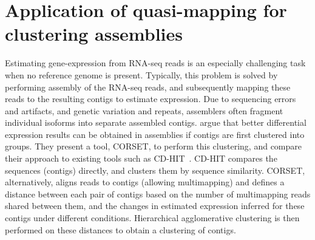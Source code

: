 \section{Application of quasi-mapping for clustering \denovo assemblies}
%
\begin{table}[h]
  \caption{Performance of CORSET, CD-HIT and \rapmap enabled clustering (R-CL) on yeast and human data}
  \label{tab:clust_perf}
\end{table}
%
Estimating gene-expression from RNA-seq reads is an especially challenging task when no reference genome is present. Typically, this problem is solved by performing \denovo assembly of the RNA-seq reads, and subsequently mapping these reads to the resulting contigs to estimate expression. Due to sequencing errors and artifacts, and genetic variation and repeats, \denovo assemblers often fragment individual isoforms into separate assembled contigs.  \citet{corset} argue that better differential expression results can be obtained in \denovo assemblies if contigs are first clustered into groups.  They present a tool, CORSET, to perform this clustering, and compare their approach to existing tools such as CD-HIT~\citep{fu2012cd}. CD-HIT compares the sequences (contigs) directly, and clusters them by sequence similarity. CORSET, alternatively, aligns reads to contigs (allowing multimapping) and defines a distance between each pair of contigs based on the number of multimapping reads shared between them, and the changes in estimated expression inferred for these contigs under different conditions. Hierarchical agglomerative clustering is then performed on these distances to obtain a clustering of contigs.

